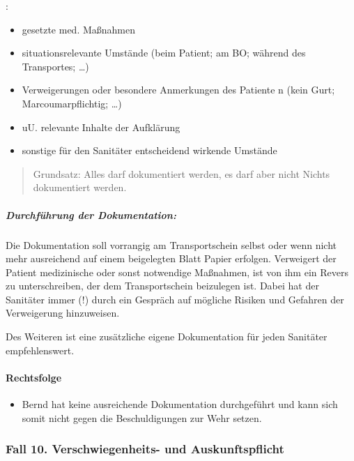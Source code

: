 {\mdseries
{}:}

\begin{itemize}
	\item {\mdseries
	gesetzte med. Ma{\ss}nahmen}

	\item {\mdseries
	situationsrelevante Umstände (beim Patient; am BO; während des
	Transportes; {\dots})}

	\item {\mdseries
	Verweigerungen oder besondere Anmerkungen des Patiente
n	(kein Gurt; Marcoumarpflichtig; {\dots})}

	\item {\mdseries
	uU. relevante Inhalte der Aufklärung}

	\item {\mdseries
	sonstige f\"ur den Sanitäter entscheidend wirkende Umstände }

\end{itemize}
\begin{quotation}
Grundsatz: Alles darf dokumentiert werden, es darf aber nicht Nichts
dokumentiert werden. 
\end{quotation}

\subparagraph*{Durchf\"uhrung der Dokumentation:}
Die Dokumentation soll vorrangig am Transportschein selbst oder wenn
nicht mehr ausreichend auf einem beigelegten Blatt Papier erfolgen.
Verweigert der Patient medizinische oder sonst notwendige
Ma{\ss}nahmen, ist von ihm ein Revers zu unterschreiben, der dem
Transportschein beizulegen ist. Dabei hat der Sanitäter
immer (!) durch ein Gespräch auf m\"ogliche Risiken und Gefahren der
Verweigerung hinzuweisen.

Des Weiteren ist eine zusätzliche eigene Dokumentation f\"ur jeden
Sanitäter empfehlenswert.

\paragraph*{Rechtsfolge}

\begin{itemize}
	\item {\mdseries\color[rgb]{0.0,0.0,0.5019608}
	Bernd hat keine ausreichende Dokumentation durchgef\"uhrt und kann sich
	somit nicht gegen die Beschuldigungen zur Wehr setzen.}

\end{itemize}

\subsubsection{Fall 10. Verschwiegenheits- und Auskunftspflicht}

